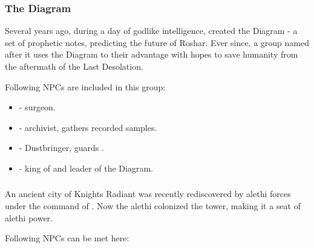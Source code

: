 \newpage
\subsubsection{The Diagram}

Several years ago, during a day of godlike intelligence, \npcTaravangian{} created the Diagram - a set of prophetic notes, predicting the future of Roshar. Ever since, a group named after it uses the Diagram to their advantage with hopes to save humanity from the aftermath of the Last Desolation.

Following NPCs are included in this group:

\begin{itemize}
	\item \npcDiagramSurgeon[s]{} - surgeon.
	
	\item \npcDiagramAarchivist[s]{} - archivist, gathers recorded samples.
	
	\item \npcMalata[s]{} - Dustbringer, guards \npcTaravangian{}.
	
	\item \npcTaravangian[s]{} - king of \locationKharbranth{} and leader of the Diagram.
\end{itemize}



\subsubsection{\locationUrithiru{}}

An ancient city of Knights Radiant was recently rediscovered by alethi forces under the command of \npcDalinar{}. Now the alethi colonized the tower, making it a seat of alethi power.

Following NPCs can be met here:

